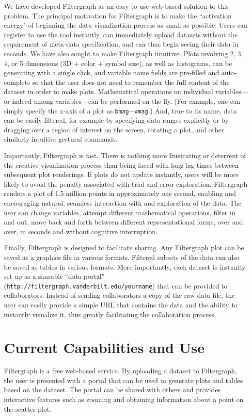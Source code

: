 We have developed Filtergraph as an easy-to-use web-based solution to this problem. The principal motivation for Filtergraph is to make the ``activation energy" of beginning the data visualization process as small as possible. Users can register to use the tool instantly, can immediately upload datasets without the requirement of meta-data specification, and can thus begin seeing their data in seconds. We have also sought to make Filtergraph intuitive. Plots involving 2, 3, 4, or 5 dimensions (3D + color + symbol size), as well as histograms, can be generating with a single click, and variable name fields are pre-filled and auto-complete so that the user does not need to remember the full content of the dataset in order to make plots. Mathematical operations on individual variables---or indeed among variables---can be performed on the fly. (For example, one can simply specify the x-axis of a plot as {\tt bmag}$-${\tt vmag}.) And, true to its name, data can be easily filtered, for example by specifying data ranges explicitly or by dragging over a region of interest on the screen, rotating a plot, and other similarly intuitive gestural commands.

Importantly, Filtergraph is fast. There is nothing more frustrating or deterrent of the creative visualization process than being faced with long lag times between subsequent plot renderings. If plots do not update instantly, users will be more likely to avoid the penalty associated with trial and error exploration. Filtergraph renders a plot of 1.5 million points in approximately one second, enabling and encouraging natural, seamless interaction with and exploration of the data. The user can change variables, attempt different mathematical operations, filter in and out, move back and forth between different representational forms, over and over, in seconds and without cognitive interruption.

Finally, Filtergraph is designed to facilitate sharing. Any Filtergraph plot can be saved as a graphics file in various formats. Filtered subsets of the data can also be saved as tables in various formats. More importantly, each dataset is instantly set up as a sharable ``data portal" ({\tt http://filtergraph.vanderbilt.edu/yourname}) that can be provided to collaborators. Instead of sending collaborators a copy of the raw data file, the user can easily provide a simple URL that contains the data and the ability to instantly visualize it, thus greatly facilitating the collaboration process.

\section{Current Capabilities and Use}
Filtergraph is a free web-based service. By uploading a dataset to Filtergraph, the user is presented with a portal that can be used to generate plots and tables based on the dataset. The portal can be shared with others and provides interactive features such as zooming and obtaining information about a point on the scatter plot.

